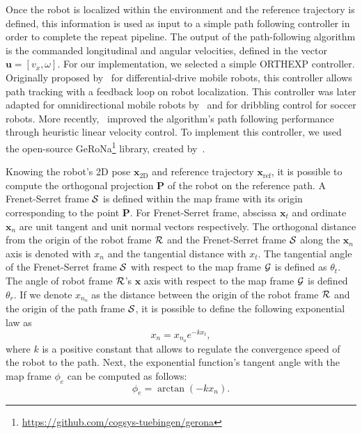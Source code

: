 Once the robot is localized within the environment and the reference trajectory is defined, this information is used as input to a simple path following controller in order to complete the repeat pipeline.
The output of the path-following algorithm is the commanded longitudinal and angular velocities, defined in the vector $\bm u = [v_x, \omega]$.
For our implementation, we selected a simple \ac{ORTHEXP} controller. 
Originally proposed by~\citet{Mojaev2004} for differential-drive mobile robots, this controller allows path tracking with a feedback loop on robot localization.
This controller was later adapted for omnidirectional mobile robots by~\citet{Li2007} and for dribbling control for soccer robots.
More recently,~\citet{Huskic2017} improved the algorithm's path following performance through heuristic linear velocity control.
To implement this controller, we used the open-source \ac{GeRoNa}\footnote{\url{https://github.com/cogsys-tuebingen/gerona}} library, created by~\citet{Huskic2019}.

Knowing the robot's 2D pose $\bm x_{\text{2D}}$ and reference trajectory $\bm x_{\text{ref}}$, it is possible to compute the orthogonal projection $\bm P$ of the robot on the reference path.
A Frenet-Serret frame $\mathcal{S}$ is defined within the map frame with its origin corresponding to the point $\bm P$.
For Frenet-Serret frame, abscissa $\bm x_t$ and ordinate $\bm x_n$ are unit tangent and unit normal vectors respectively. 
The orthogonal distance from the origin of the robot frame $\mathcal{R}$ and the Frenet-Serret frame $\mathcal{S}$ along the $\bm x_n$ axis is denoted with $x_n$ and the tangential distance with $x_t$.
The tangential angle of the Frenet-Serret frame $\mathcal{S}$ with respect to the map frame $\mathcal{G}$ is defined as $\theta_t$.
The angle of robot frame $\mathcal{R}$'s $\bm x$ axis with respect to the map frame $\mathcal{G}$ is defined $\theta_r$. %
If we denote $x_{n_o}$ as the distance between the origin of the robot frame $\mathcal{R}$ and the origin of the path frame $\mathcal{S}$, it is possible to define the following exponential law as
\begin{equation}
\label{eq:exp_law}
	x_n = x_{n_o} e^{-k x_t},
\end{equation}
where $k$ is a positive constant that allows to regulate the convergence speed of the robot to the path.
Next, the exponential function's tangent angle with the map frame $\phi_e$ can be computed as follows:
\begin{equation}
\label{eq:exp_angle}
\phi_e = \arctan(-k x_n).
\end{equation}

